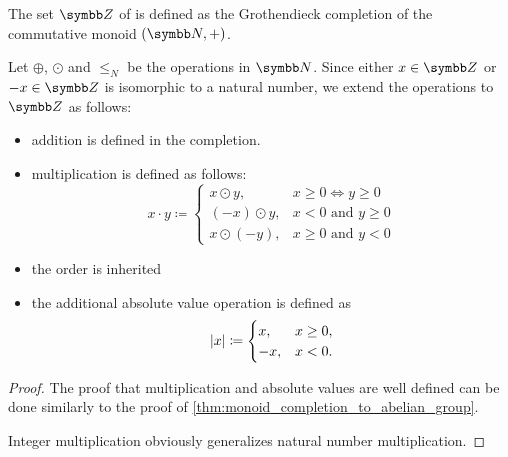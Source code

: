 \begin{definition}\label{def:integers}
  The set \( \Z \) of  is defined as the Grothendieck completion of the commutative monoid \( (\BB{N}, +) \).

  Let \( \oplus \), \( \odot \) and \( \leq_N \) be the operations in \( \BB{N} \). Since either \( x \in \Z \) or \( -x \in \Z \) is isomorphic to a natural number, we extend the operations to \( \Z \) as follows:
  \begin{itemize}
    \item addition is defined in the completion.
    \item multiplication is defined as follows:
    \begin{equation*}
      x \cdot y \coloneqq \begin{cases}
        x \odot y, & x \geq 0 \iff y \geq 0 \\
        (-x) \odot y, & x < 0 \text{ and } y \geq 0 \\
        x \odot (-y), & x \geq 0 \text{ and } y < 0
      \end{cases}
    \end{equation*}

    \item the order is inherited
    \item the additional absolute value operation is defined as
    \begin{equation*}
      \left\vert x \right\vert \coloneqq \begin{cases}
        x, &x \geq 0, \\
        -x, &x < 0.
      \end{cases}
    \end{equation*}
  \end{itemize}
\end{definition}
\begin{proof}
  The proof that multiplication and absolute values are well defined can be done similarly to the proof of \cref{thm:monoid_completion_to_abelian_group}.

  Integer multiplication obviously generalizes natural number multiplication.
\end{proof}

